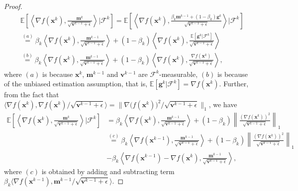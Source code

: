 \documentclass[twoside,11pt]{article}
\begin{document}
\begin{proof}
\begin{equation}
	\begin{aligned}
		&\mathbb{E}\left[ \left\langle \nabla f(\mathbf{x}^k),\frac{\mathbf{m}^k}{\sqrt{\mathbf{v}^{k-1}+\epsilon}}\right\rangle \bigg| \mathcal{F}^k\right]
		=\mathbb{E}\left[ \left\langle \nabla f(\mathbf{x}^k),\frac{\beta_k \mathbf{m}^{k-1}+(1-\beta_k )\mathbf{g}^k}{\sqrt{\mathbf{v}^{k-1}+\epsilon}}\right\rangle \bigg| \mathcal{F}^k\right]\\
		&{\overset{(a)}{=}}\beta_k\left\langle \nabla f(\mathbf{x}^k),\frac{ \mathbf{m}^{k-1}}{\sqrt{\mathbf{v}^{k-1}+\epsilon}}\right\rangle
		+(1-\beta_k)\left\langle \nabla f(\mathbf{x}^k),\frac{\mathbb{E}\left[ \mathbf{g}^k|
		\mathcal{F}^k\right] }{\sqrt{\mathbf{v}^{k-1}+\epsilon}}\right\rangle\\
		&{\overset{(b)}{=}}
		\beta_k\left\langle \nabla f(\mathbf{x}^k),\frac{ \mathbf{m}^{k-1}}{\sqrt{\mathbf{v}^{k-1}+\epsilon}}\right\rangle+(1-\beta_k)\left\langle \nabla f(\mathbf{x}^k),\frac{\nabla f(\mathbf{x}^k) }{\sqrt{\mathbf{v}^{k-1}+\epsilon}}\right\rangle,\nonumber
	\end{aligned}
\end{equation}
where $(a)$ is because $\mathbf{x}^{k}$, $\mathbf{m}^{k-1}$ and $\mathbf{v}^{k-1}$ are $\mathcal{F}^k$-measurable, $(b)$ is because of the unbiased estimation assumption,  that is,   $\mathbb{E}[ \mathbf{g}^k|\mathcal{F}^k] = \nabla f(\mathbf{x}^k)$. Further, from the fact that $\langle\nabla f(\mathbf{x}^{k}),\nabla f(\mathbf{x}^{k})/\sqrt{\mathbf{v}^{k-1}+\epsilon}\rangle=\lVert\nabla \big(f(\mathbf{x}^{k})\big)^{2}/\sqrt{\mathbf{v}^{k-1}+\epsilon}\rVert_{1}$, we have
\begin{equation}\label{th1.3}
	\begin{aligned}
		\mathbb{E}\left[ \left\langle \nabla f(\mathbf{x}^k),\frac{\mathbf{m}^k}{\sqrt{\mathbf{v}^{k-1}+\epsilon}}\right\rangle \bigg| \mathcal{F}^k\right]
		&{=}\beta_k\left\langle \nabla f(\mathbf{x}^k),\frac{ \mathbf{m}^{k-1}}{\sqrt{\mathbf{v}^{k-1}+\epsilon}}\right\rangle+(1-\beta_k)\left\| \frac{(\nabla f(\mathbf{x}^k))^2 }{\sqrt{\mathbf{v}^{k-1}+\epsilon}}\right\|_1\\
		&{\overset{(c)}{=}}
		\beta_k\left\langle \nabla f(\mathbf{x}^{k-1}),\frac{ \mathbf{m}^{k-1}}{\sqrt{\mathbf{v}^{k-1}+\epsilon}}\right\rangle
		+(1-\beta_k)\left\| \frac{(\nabla f(\mathbf{x}^k))^2 }{\sqrt{\mathbf{v}^{k-1}+\epsilon}}\right\|_1
		\\
		&{-}\beta_k\left\langle \nabla f(\mathbf{x}^{k-1})-\nabla f(\mathbf{x}^k),\frac{ \mathbf{m}^{k-1}}{\sqrt{\mathbf{v}^{k-1}+\epsilon}}\right\rangle
		,
	\end{aligned}
\end{equation}
where $(c)$ is obtained by  adding and subtracting term  $\beta_k\langle  \nabla f(\mathbf{x}^{k-1}), \mathbf{m}^{k-1}/\sqrt{\mathbf{v}^{k-1}+\epsilon}\rangle $.


\end{proof}
\end{document}
